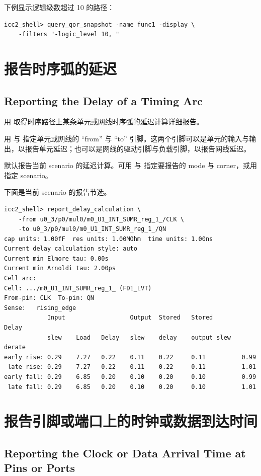 下例显示逻辑级数超过 10 的路径：
\begin{lstlisting}
icc2_shell> query_qor_snapshot -name func1 -display \
    -filters "-logic_level 10, "
\end{lstlisting}

\section{报告时序弧的延迟}
\subsection*{Reporting the Delay of a Timing Arc}

用  取得时序路径上某条单元或网线时序弧的延迟计算详细报告。

用  与  指定单元或网线的 ``from'' 与 ``to'' 引脚。这两个引脚可以是单元的输入与输出，以报告单元延迟；也可以是网线的驱动引脚与负载引脚，以报告网线延迟。

默认报告当前 scenario 的延迟计算。可用  与  指定要报告的 mode 与 corner，或用  指定 scenario。

下面是当前 scenario 的报告节选。
\begin{lstlisting}[caption={延迟计算报告}]
icc2_shell> report_delay_calculation \
    -from u0_3/p0/mul0/m0_U1_INT_SUMR_reg_1_/CLK \
    -to u0_3/p0/mul0/m0_U1_INT_SUMR_reg_1_/QN
cap units: 1.00fF  res units: 1.00MOhm  time units: 1.00ns
Current delay calculation style: auto
Current min Elmore tau: 0.00s
Current min Arnoldi tau: 2.00ps
Cell arc:
Cell: .../m0_U1_INT_SUMR_reg_1_ (FD1_LVT)
From-pin: CLK  To-pin: QN
Sense:   rising_edge
            Input                  Output  Stored   Stored        Delay
            slew    Load   Delay   slew    delay    output slew   derate
early rise: 0.29    7.27   0.22    0.11    0.22     0.11          0.99
 late rise: 0.29    7.27   0.22    0.11    0.22     0.11          1.01
early fall: 0.29    6.85   0.20    0.10    0.20     0.10          0.99
 late fall: 0.29    6.85   0.20    0.10    0.20     0.10          1.01
\end{lstlisting}

\section{报告引脚或端口上的时钟或数据到达时间}
\subsection*{Reporting the Clock or Data Arrival Time at Pins or Ports}

